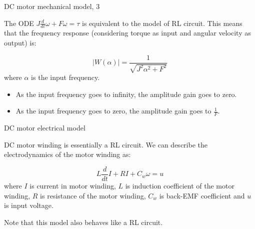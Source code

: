 \documentclass{beamer}
\begin{document}
\begin{frame}{DC motor mechanical model, 3}
	\begin{flushleft}
		
		The ODE $J \frac{d}{dt} \omega + F \omega = \tau$ is equivalent to the model of RL circuit. This means that the frequency response (considering torque as input and angular velocity as output) is:
		
		\begin{equation}
			|W(\alpha)| =
			\frac{1}{\sqrt{J^2\alpha^2 + F^2}}
		\end{equation}
	where $\alpha$ is the input frequency.
	
	\begin{itemize}
		\item As the input frequency goes to infinity, the amplitude gain goes to zero. 
		\item As the input frequency goes to zero, the amplitude gain goes to $\frac{1}{F}$.
	\end{itemize}
	
		
	\end{flushleft}
\end{frame}




\begin{frame}{DC motor electrical model}
	\begin{flushleft}
		
		DC motor winding is essentially a RL circuit. We can describe the electrodynamics of the motor winding as:
		
		\begin{equation}
			L \frac{d}{dt} I + RI + C_w \omega = u
		\end{equation}
		where $I$ is current in motor winding, $L$ is induction coefficient of the motor winding, $R$ is resistance of the motor winding, $C_w$ is back-EMF coefficient and $u$ is input voltage.
		
		\bigskip
		
		Note that this model also behaves like a RL circuit.
		
	\end{flushleft}
\end{frame}
\end{document}
